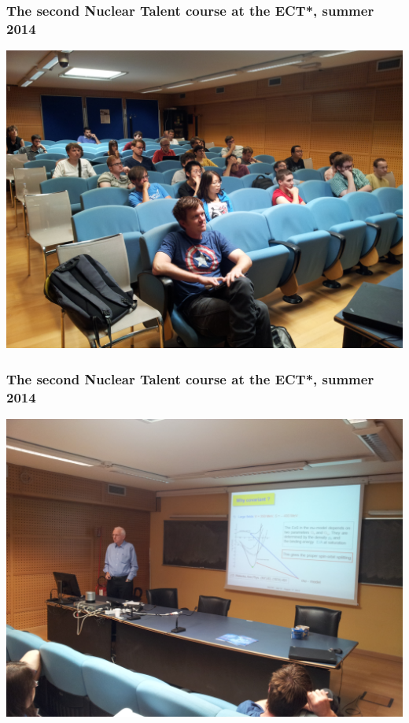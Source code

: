 \documentclass{beamer}
\begin{document}
\begin{frame}
\frametitle{The second Nuclear Talent course at the ECT*, summer 2014}

\vspace{6mm}

\centerline{\includegraphics[width=1.0\linewidth]{Photos/talent2014a.jpg}}

\vspace{6mm}
\end{frame}

\begin{frame}
\frametitle{The second Nuclear Talent course at the ECT*, summer 2014}

\vspace{6mm}

\centerline{\includegraphics[width=1.0\linewidth]{Photos/talent2014b.jpg}}

\vspace{6mm}
\end{frame}
\end{document}
